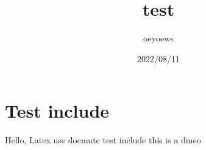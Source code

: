 \documentclass{article}
\title{test}
\author{oeyoews}
\date{2022/08/11}
\begin{document}
\maketitle

\section{Test include}%
\label{sec:Test include}

Hello, Latex use docmute test include
this is a dmeo
\end{document}
